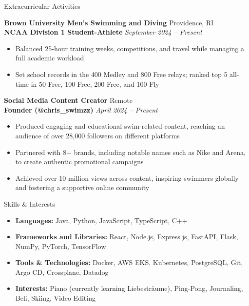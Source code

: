 \documentclass[10pt]{czresume}
\begin{document}
\begin{rSection}{Extracurricular Activities}

\textbf{Brown University Men's Swimming and Diving} \hfill {Providence, RI}\\
\textbf{NCAA Division 1 Student-Athlete} \hfill {\em September 2024 -- Present}
\begin{itemize}
    \item Balanced 25-hour training weeks, competitions, and travel while managing a full academic workload
    \item Set school records in the 400 Medley and 800 Free relays; ranked top 5 all-time in 50 Free, 100 Free, 200 Free, and 100 Fly
\end{itemize}
\vspace{0.5em}

\textbf{Social Media Content Creator} \hfill {Remote}\\
\textbf{Founder (@chris\_swimzz)} \hfill {\em April 2024 -- Present}
\begin{itemize}
    \item Produced engaging and educational swim-related content, reaching an audience of over 28,000 followers on different platforms
    \item Partnered with 8+ brands, including notable names such as Nike and Arena, to create authentic promotional campaigns
    \item Achieved over 10 million views across content, inspiring swimmers globally and fostering a supportive online community
\end{itemize}

\end{rSection}

\begin{rSection}{Skills \& Interests}
\begin{itemize}
    \item \textbf{Languages:} Java, Python, JavaScript, TypeScript, C++
    \item \textbf{Frameworks and Libraries:} React, Node.js, Express.js, FastAPI, Flask, NumPy, PyTorch, TensorFlow
    \item \textbf{Tools \& Technologies:} Docker, AWS EKS, Kubernetes, PostgreSQL, Git, Argo CD, Crossplane, Datadog
    \item \textbf{Interests:} Piano (currently learning Liebestr\"{a}ume), Ping-Pong, Journaling, Beli, Skiing, Video Editing
\end{itemize}
\end{rSection}
\end{document}
